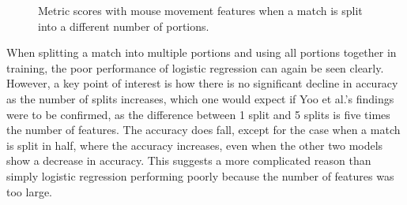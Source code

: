 \documentclass[Report.tex]{subfiles}
\newcommand{\baraxis}[7]{
\begin{axis}[
    ybar,
    title={#1},
    width=#5,
    height=#6,
    ymin=#3, ymax=#4,
    bar width=1em,
    legend style={at={#7},anchor=north,legend columns=-1},
    enlarge x limits=0.4,
    x tick label style={align=center,text width=1.7cm},
    symbolic x coords={Logistic Regression, Random Forest, Multi-layer Perceptron},
    xtick=data,
    ylabel={#2}
]
}
\newcommand{\plotbar}[5]{
\addplot+[
	discard if not={numSplits}{#1},
	discard if not={split}{#2},
	discard if not={features}{#3},
] table [x=model, y=#4,col sep=comma] {data/20-pair-cv.csv};
\addlegendentry{#5}
}
\begin{document}
\begin{figure}[H]
\begin{subfigure}{1\textwidth}
\centering
{}
\end{subfigure}

\begin{subfigure}{0.45\textwidth}
\centering
{}
\end{subfigure}
\hspace{\fill}
\begin{subfigure}{0.45\textwidth}
\centering
{}
\end{subfigure}
\caption{Metric scores with mouse movement features when a match is split into a different number of portions.}
\end{figure}

When splitting a match into multiple portions and using all portions together in training, the poor performance of logistic regression can again be seen clearly. However, a key point of interest is how there is no significant decline in accuracy as the number of splits increases, which one would expect if Yoo et al.'s \cite{lr-vs-rf} findings were to be confirmed, as the difference between 1 split and 5 splits is five times the number of features. The accuracy does fall, except for the case when a match is split in half, where the accuracy increases, even when the other two models show a decrease in accuracy. This suggests a more complicated reason than simply logistic regression performing poorly because the number of features was too large. 
\end{document}
